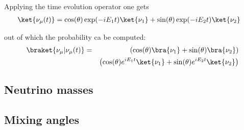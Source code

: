 Applying the time evolution operator one gets
\begin{align}
    \nonumber
    \ket{\nu_\mu (t)} &= \cos(\theta) \exp(-iE_1t) \ket{\nu_1} + \sin(\theta) \exp(-iE_2t) \ket{\nu_2}
\end{align}

out of which the probability ca be computed:
\begin{align}
    \nonumber
    \braket{\nu_\mu | \nu_\mu(t)} &= & \left( \cos(\theta) \bra{\nu_1} + \sin(\theta) \bra{\nu_2} \right) \\
    \nonumber
    & &\left(\cos(\theta) e^{iE_1t} \ket{\nu_1} + \sin(\theta) e^{iE_2t} \ket{\nu_2} \right)
\end{align}

\subsection{Neutrino masses}
\lipsum[21]
\cite{Gerbino:2015ixa}
\lipsum[22]

\subsection{Mixing angles}
\lipsum[23]
\cite{Guo:2007ug}
\lipsum[24]

\newpage

